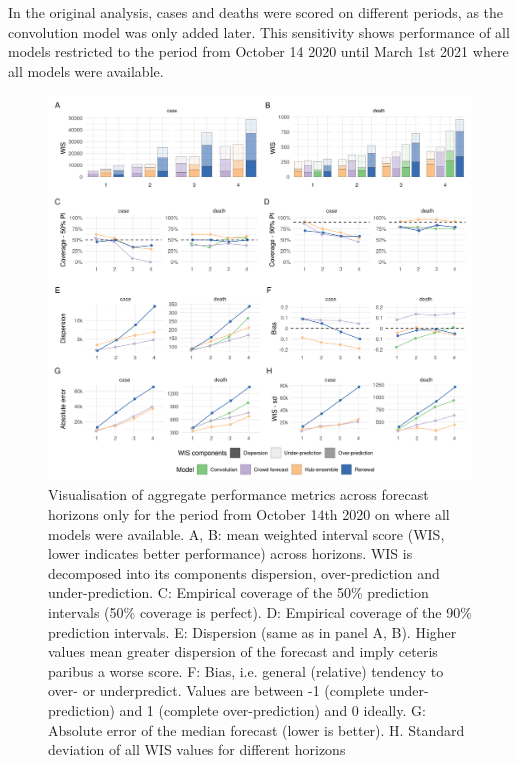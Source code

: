 \documentclass[
]{article}
\begin{document}
In the original analysis, cases and deaths were scored on different periods, as the convolution model was only added later. This sensitivity shows performance of all models restricted to the period from October 14 2020 until March 1st 2021 where all models were available.

\begin{figure}[H]
\includegraphics[width=1\linewidth,]{../analysis/plots/aggregate-performance-all-late-period-v4} \caption{Visualisation of aggregate performance metrics across forecast horizons only for the period from October 14th 2020 on where all models were available. A, B: mean weighted interval score (WIS, lower indicates better performance) across horizons. WIS is decomposed into its components dispersion, over-prediction and under-prediction. C: Empirical coverage of the 50\% prediction intervals (50\% coverage is perfect). D: Empirical coverage of the 90\% prediction intervals. E: Dispersion (same as in panel A, B). Higher values mean greater dispersion of the forecast and imply ceteris paribus a worse score. F: Bias, i.e. general (relative) tendency to over- or underpredict. Values are between -1 (complete under-prediction) and 1 (complete over-prediction) and 0 ideally. G: Absolute error of the median forecast (lower is better). H. Standard deviation of all WIS values for different horizons}\label{fig:agg-performance-all-late}
\end{figure}
\end{document}
